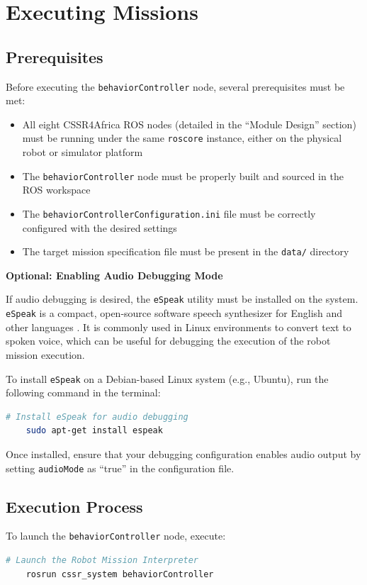 \documentclass{CSSRforAfrica}
\begin{document}
\section{Executing Missions}
\subsection{Prerequisites}
Before executing the \texttt{\small behaviorController} node, several prerequisites must be met:
\begin{itemize}
    \item All eight CSSR4Africa ROS nodes (detailed in the ``Module Design'' section) must be running under the same \texttt{\small roscore} instance, either on the physical robot or simulator platform
    \item The \texttt{\small behaviorController} node must be properly built and sourced in the ROS workspace
    \item The \texttt{\small behaviorControllerConfiguration.ini} file must be correctly configured with the desired settings
    \item The target mission specification file must be present in the \texttt{\small data/} directory
\end{itemize}

\vspace{0.5em}
\noindent\textbf{Optional: Enabling Audio Debugging Mode}

\noindent If audio debugging is desired, the \texttt{\small eSpeak} utility must be installed on the system. \texttt{\small eSpeak} is a compact, open-source software speech synthesizer for English and other languages \cite{eSpeakWebsite}. It is commonly used in Linux environments to convert text to spoken voice, which can be useful for debugging the execution of the robot mission execution.

\vspace{0.3em}
\noindent To install \texttt{\small eSpeak} on a Debian-based Linux system (e.g., Ubuntu), run the following command in the terminal:
\begin{lstlisting}[style=withoutNumbering, language=bash]
    # Install eSpeak for audio debugging
    sudo apt-get install espeak
\end{lstlisting}

\noindent Once installed, ensure that your debugging configuration enables audio output by setting \texttt{\small audioMode} as ``true'' in the configuration file.

\subsection{Execution Process}
To launch the \texttt{\small behaviorController} node, execute:
\begin{lstlisting}[style=withoutNumbering, language=bash]
    # Launch the Robot Mission Interpreter
    rosrun cssr_system behaviorController
\end{lstlisting}
\end{document}
